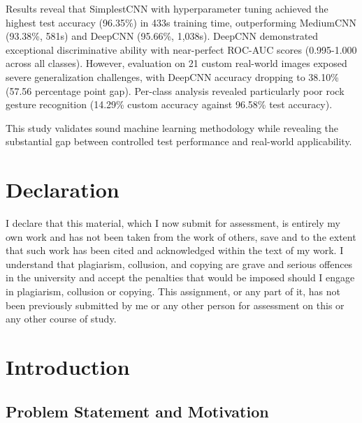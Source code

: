 \documentclass[12pt,a4paper]{article}
\begin{document}
\begin{titlepage}
\begin{minipage}{0.9\textwidth}
Results reveal that SimplestCNN with hyperparameter tuning achieved the highest test accuracy (96.35\%) in 433s training time, outperforming MediumCNN (93.38\%, 581s) and DeepCNN (95.66\%, 1,038s). DeepCNN demonstrated exceptional discriminative ability with near-perfect ROC-AUC scores (0.995-1.000 across all classes). However, evaluation on 21 custom real-world images exposed severe generalization challenges, with DeepCNN accuracy dropping to 38.10\% (57.56 percentage point gap). Per-class analysis revealed particularly poor rock gesture recognition (14.29\% custom accuracy against 96.58\% test accuracy).

This study validates sound machine learning methodology while revealing the substantial gap between controlled test performance and real-world applicability.

\end{minipage}

\vspace{1cm}

\end{titlepage}

\newpage
\thispagestyle{empty}
\vspace*{2cm}

\section*{Declaration}

I declare that this material, which I now submit for assessment, is entirely my own work and has not been taken from the work of others, save and to the extent that such work has been cited and acknowledged within the text of my work. I understand that plagiarism, collusion, and copying are grave and serious offences in the university and accept the penalties that would be imposed should I engage in plagiarism, collusion or copying. This assignment, or any part of it, has not been previously submitted by me or any other person for assessment on this or any other course of study.


\newpage

\tableofcontents
\newpage

\section{Introduction}

\subsection{Problem Statement and Motivation}
\end{document}
